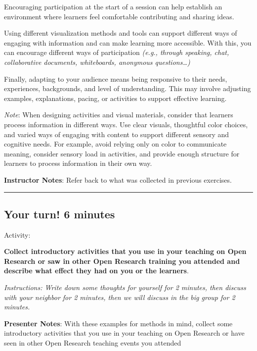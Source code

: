 \documentclass[
  letterpaper,
  DIV=11,
  numbers=noendperiod]{scrartcl}
\begin{document}
Encouraging participation at the start of a session can help establish
an environment where learners feel comfortable contributing and sharing
ideas.

Using different visualization methods and tools can support different
ways of engaging with information and can make learning more accessible.
With this, you can encourage different ways of participation
\emph{(e.g., through speaking, chat, collaborative documents,
whiteboards, anonymous questions\ldots)}

Finally, adapting to your audience means being responsive to their
needs, experiences, backgrounds, and level of understanding. This may
involve adjusting examples, explanations, pacing, or activities to
support effective learning.

\emph{Note}: When designing activities and visual materials, consider
that learners process information in different ways. Use clear visuals,
thoughtful color choices, and varied ways of engaging with content to
support different sensory and cognitive needs. For example, avoid
relying only on color to communicate meaning, consider sensory load in
activities, and provide enough structure for learners to process
information in their own way.

\textbf{Instructor Notes}: Refer back to what was collected in previous
exercises.

\begin{center}\rule{0.5\linewidth}{0.5pt}\end{center}

\subsection{Your turn! 6 minutes}\label{your-turn-6-minutes}

Activity:

\textbf{Collect introductory activities that you use in your teaching on
Open Research or saw in other Open Research training you attended and
describe what effect they had on you or the learners}.

\emph{Instructions: Write down some thoughts for yourself for 2 minutes,
then discuss with your neighbor for 2 minutes, then we will discuss in
the big group for 2 minutes.}

\textbf{Presenter Notes}: With these examples for methods in mind,
collect some introductory activities that you use in your teaching on
Open Research or have seen in other Open Research teaching events you
attended
\end{document}
